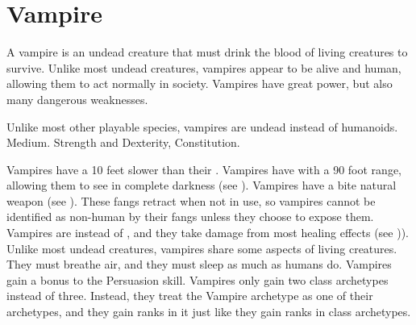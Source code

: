 


\section{Vampire}
  A vampire is an undead creature that must drink the blood of living creatures to survive.
  Unlike most undead creatures, vampires appear to be alive and human, allowing them to act normally in society.
  Vampires have great power, but also many dangerous weaknesses.

   Unlike most other playable species, vampires are undead instead of humanoids.
   Medium.
    Strength and Dexterity,  Constitution.
  \begin{itemize}
     Vampires have a  10 feet slower than their .
     Vampires have  with a 90 foot range, allowing them to see in complete darkness (see ).
     Vampires have a bite natural weapon (see ).
      These fangs retract when not in use, so vampires cannot be identified as non-human by their fangs unless they choose to expose them.
     Vampires are  instead of , and they take damage from most healing effects (see )).
     Unlike most undead creatures, vampires share some aspects of living creatures.
      They must breathe air, and they must sleep as much as humans do.
     Vampires gain a  bonus to the Persuasion skill.
     Vampires only gain two class archetypes instead of three.
      Instead, they treat the Vampire archetype as one of their archetypes, and they gain ranks in it just like they gain ranks in class archetypes.
  \end{itemize}

